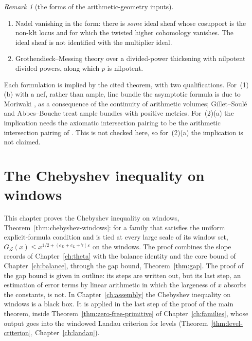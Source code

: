 \documentclass[11pt]{amsbook}
\theoremstyle{plain}
\theoremstyle{definition}
\theoremstyle{remark}
\newtheorem{remark}[theorem]{Remark}
\numberwithin{equation}{section}
\numberwithin{figure}{chapter}
\numberwithin{table}{chapter}
\newcommand{\eps}{\varepsilon}
\newcommand{\lev}{\mathscr{L}}
\begin{document}
\begin{remark}[the forms of the arithmetic-geometry inputs]
\begin{enumerate}[label=(\arabic*)]
\begin{enumerate}[label=(\alph*)]
\item Nadel vanishing \cite{Nadel1990} in the form: there is \emph{some} ideal
sheaf
whose cosupport is the non-klt locus and for which the twisted higher
cohomology vanishes. The ideal sheaf is not identified with the
multiplier ideal.
\item Grothendieck--Messing theory \cite{Messing1972} over a
divided-power thickening
with nilpotent divided powers, along which $p$ is nilpotent.
\end{enumerate}
\end{enumerate}
Each formulation is implied by the cited theorem, with two
qualifications. For~(1)(b) with a nef, rather than ample, line bundle
the asymptotic formula is due to Moriwaki \cite{Moriwaki2009}, as a
consequence of the continuity of arithmetic volumes; Gillet--Soul\'e
and Abbes--Bouche treat ample bundles with positive metrics.
For~(2)(a) the implication needs the axiomatic intersection pairing to
be the arithmetic intersection pairing of \cite{Moriwaki2009}. This
is not checked here, so for~(2)(a) the implication is not claimed.
\end{remark}
\clearpage
\clearpage
\chapter{The Chebyshev inequality on windows}
\label{ch:chebyshev}\label{sec:chebwin}

This chapter proves the Chebyshev inequality on windows,
Theorem~\ref{thm:chebyshev-windows}: for a family that satisfies the
uniform explicit-formula condition and is tied at every large scale of
its window set, $G_\lev(x)\le x^{1/2+(e_D+e_L+7)\eps}$ on the windows.
The proof combines the slope records of Chapter~\ref{ch:theta} with
the balance identity and the core bound of Chapter~\ref{ch:balance},
through the gap bound, Theorem~\ref{thm:gap}. The proof of the gap
bound is given in outline: its steps are written out, but its last
step, an estimation of error terms by linear arithmetic in which the
largeness of $x$ absorbs the constants, is not. In
Chapter~\ref{ch:assembly} the Chebyshev inequality on windows is a
black box. It is applied in the last step of the proof of the main
theorem, inside Theorem~\ref{thm:zero-free-primitive} of
Chapter~\ref{ch:families}, whose output goes into the windowed Landau
criterion for levels (Theorem~\ref{thm:level-criterion},
Chapter~\ref{ch:landau}).
\end{document}
